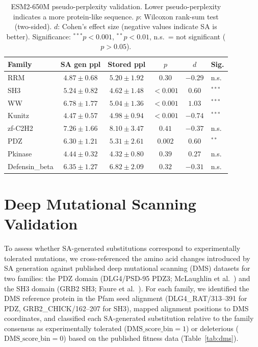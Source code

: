 \begin{table}[ht]
\centering
\caption{ESM2-650M pseudo-perplexity validation. Lower pseudo-perplexity indicates a more protein-like sequence. $p$: Wilcoxon rank-sum test (two-sided). $d$: Cohen's effect size (negative values indicate SA is better). Significance: $^{***}p < 0.001$, $^{**}p < 0.01$, n.s.\ = not significant ($p > 0.05$).}
\label{tab:esm2}
\small
\begin{tabular}{@{}lccccl@{}}
\toprule
Family & SA gen ppl & Stored ppl & $p$ & $d$ & Sig. \\
\midrule
RRM            & $4.87 \pm 0.68$ & $5.20 \pm 1.92$ & $0.30$    & $-0.29$ & n.s. \\
SH3            & $5.24 \pm 0.82$ & $4.62 \pm 1.48$ & $<0.001$  & $0.60$  & $^{***}$ \\
WW             & $6.78 \pm 1.77$ & $5.04 \pm 1.36$ & $<0.001$  & $1.03$  & $^{***}$ \\
Kunitz         & $4.47 \pm 0.57$ & $4.98 \pm 0.94$ & $<0.001$  & $-0.74$ & $^{***}$ \\
zf-C2H2        & $7.26 \pm 1.66$ & $8.10 \pm 3.47$ & $0.41$    & $-0.37$ & n.s. \\
PDZ            & $6.30 \pm 1.21$ & $5.31 \pm 2.61$ & $0.002$   & $0.60$  & $^{**}$ \\
Pkinase        & $4.44 \pm 0.32$ & $4.32 \pm 0.80$ & $0.39$    & $0.27$  & n.s. \\
Defensin\_beta & $6.35 \pm 1.27$ & $6.82 \pm 2.09$ & $0.32$    & $-0.31$ & n.s. \\
\bottomrule
\end{tabular}
\end{table}

\section{Deep Mutational Scanning Validation}\label{si:dms}

To assess whether SA-generated substitutions correspond to experimentally tolerated mutations, we cross-referenced the amino acid changes introduced by SA generation against published deep mutational scanning (DMS) datasets for two families: the PDZ domain (DLG4/PSD-95 PDZ3; McLaughlin et al.~\cite{mclaughlinSpatialArchitecture2012}) and the SH3 domain (GRB2 SH3; Faure et al.~\cite{faureDoubleDMS2022}). For each family, we identified the DMS reference protein in the Pfam seed alignment (DLG4\_RAT/313--391 for PDZ, GRB2\_CHICK/162--207 for SH3), mapped alignment positions to DMS coordinates, and classified each SA-generated substitution relative to the family consensus as experimentally tolerated ($\mathrm{DMS\_score\_bin}{=}1$) or deleterious ($\mathrm{DMS\_score\_bin}{=}0$) based on the published fitness data (Table~\ref{tab:dms}).

